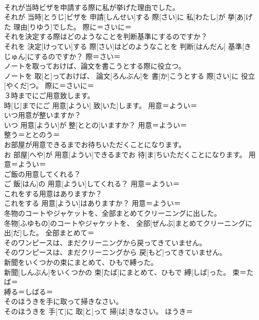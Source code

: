 \documentclass[8pt]{extreport}
\begin{document}
\begin{CJK}{UTF8}{min}
\\	それが当時ビザを申請する際に私が挙げた理由でした。	
\\	それが 当時[とうじ]ビザを 申請[しんせい]する 際[さい]に 私[わたし]が 挙[あ]げた 理由[りゆう]でした。	際に＝さいに＝ 
\\	それを決定する際はどのようなことを判断基準にするのですか？	
\\	それを 決定[けってい]する 際[さい]はどのようなことを 判断[はんだん] 基準[きじゅん]にするのですか？	際＝さい＝ 
\\	ノートを取っておけば、論文を書こうとする際に役立つ。	
\\	ノートを 取[と]っておけば、 論文[ろんぶん]を 書[か]こうとする 際[さい]に 役立[やくだ]つ。	際に＝さいに＝ 
\\	３時までにご用意致します。	
\\	時[じ]までにご 用意[ようい] 致[いた]します。	用意＝ようい＝ 
\\	いつ用意が整いますか？	
\\	いつ 用意[ようい]が 整[ととの]いますか？	用意＝ようい＝ 
\\	整う＝ととのう＝ 
\\	お部屋が用意できるまでお待ちいただくことになります。	
\\	お 部屋[へや]が 用意[ようい]できるまでお 待[ま]ちいただくことになります。	用意＝ようい＝ 
\\	ご飯の用意してくれる？	
\\	ご 飯[はん]の 用意[ようい]してくれる？	用意＝ようい＝ 
\\	これをする用意はありますか？	
\\	これをする 用意[ようい]はありますか？	用意＝ようい＝ 
\\	冬物のコートやジャケットを、全部まとめてクリーニングに出した。	
\\	冬物[ふゆもの]のコートやジャケットを、 全部[ぜんぶ]まとめてクリーニングに 出[だ]した。	全部まとめて＝ 
\\	そのワンピースは、まだクリーニングから戻ってきていません。	
\\	そのワンピースは、まだクリーニングから 戻[もど]ってきていません。	
\\	新聞をいくつかの束にまとめて、ひもで縛った。	
\\	新聞[しんぶん]をいくつかの 束[たば]にまとめて、ひもで 縛[しば]った。	束＝たば＝ 
\\	縛る＝しばる＝ 
\\	そのほうきを手に取って掃きなさい。	
\\	そのほうきを 手[て]に 取[と]って 掃[は]きなさい。	ほうき＝ 

\end{CJK}
\end{document}

